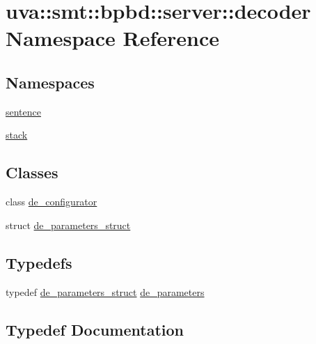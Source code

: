 \hypertarget{namespaceuva_1_1smt_1_1bpbd_1_1server_1_1decoder}{}\section{uva\+:\+:smt\+:\+:bpbd\+:\+:server\+:\+:decoder Namespace Reference}
\label{namespaceuva_1_1smt_1_1bpbd_1_1server_1_1decoder}
\subsection*{Namespaces}
\begin{DoxyCompactItemize}
\item 
 \hyperlink{namespaceuva_1_1smt_1_1bpbd_1_1server_1_1decoder_1_1sentence}{sentence}
\item 
 \hyperlink{namespaceuva_1_1smt_1_1bpbd_1_1server_1_1decoder_1_1stack}{stack}
\end{DoxyCompactItemize}
\subsection*{Classes}
\begin{DoxyCompactItemize}
\item 
class \hyperlink{classuva_1_1smt_1_1bpbd_1_1server_1_1decoder_1_1de__configurator}{de\+\_\+configurator}
\item 
struct \hyperlink{structuva_1_1smt_1_1bpbd_1_1server_1_1decoder_1_1de__parameters__struct}{de\+\_\+parameters\+\_\+struct}
\end{DoxyCompactItemize}
\subsection*{Typedefs}
\begin{DoxyCompactItemize}
\item 
typedef \hyperlink{structuva_1_1smt_1_1bpbd_1_1server_1_1decoder_1_1de__parameters__struct}{de\+\_\+parameters\+\_\+struct} \hyperlink{namespaceuva_1_1smt_1_1bpbd_1_1server_1_1decoder_aaf4d5faf3a48156401c854d163d4b848}{de\+\_\+parameters}
\end{DoxyCompactItemize}


\subsection{Typedef Documentation}
\hypertarget{namespaceuva_1_1smt_1_1bpbd_1_1server_1_1decoder_aaf4d5faf3a48156401c854d163d4b848}{}
